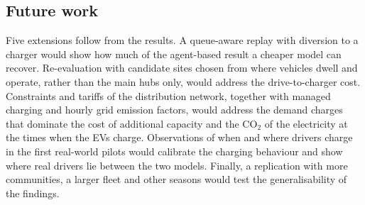 \documentclass{elsarticle}
\begin{document}
\subsection{Future work}
Five extensions follow from the results. A queue-aware replay with diversion to a charger would show how much of the agent-based result a cheaper model can recover. Re-evaluation with candidate sites chosen from where vehicles dwell and operate, rather than the main hubs only, would address the drive-to-charger cost. Constraints and tariffs of the distribution network, together with managed charging and hourly grid emission factors, would address the demand charges that dominate the cost of additional capacity and the CO$_2$ of the electricity at the times when the EVs charge. Observations of when and where drivers charge in the first real-world pilots would calibrate the charging behaviour and show where real drivers lie between the two models. Finally, a replication with more communities, a larger fleet and other seasons would test the generalisability of the findings.

\end{document}
